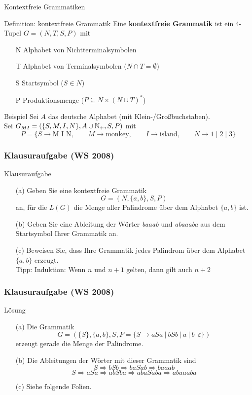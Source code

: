 \begin{frame}{Kontextfreie Grammatiken}
	\begin{block}{Definition: kontextfreie Grammatik}
		Eine \textbf{kontextfreie Grammatik} ist ein 4-Tupel $G = (N, T, S ,P)$ mit
		\begin{itemize}
			\item[N] Alphabet von Nichtterminalsymbolen
			\item[T] Alphabet von Terminalsymbolen ($N \cap T = \emptyset$)
			\item[S] Startsymbol ($S \in N$)
			\item[P] Produktionsmenge ($P \subseteq N \times (N \cup T)^\ast$)
		\end{itemize}
	\end{block}

	\begin{exampleblock}{Beispiel}
		Sei $A$ das deutsche Alphabet (mit Klein-/Großbuchstaben).\\
		Sei $G_{MI} = (\{S, M, I, N\}, A \cup \mathbb{N}_+, S, P)$ mit
		\[
			P = \{S \to \text{M I N}, \qquad M \to \text{monkey}, \qquad I \to \text{island}, \qquad N \to 1 \mid 2 \mid 3 \}
		\]
	\end{exampleblock}
\end{frame}
\begin{frame}
	\frametitle{Klausuraufgabe (WS 2008)}
	\begin{exampleblock}{Klausuraufgabe}
	\begin{itemize}
		\item[(a)] Geben Sie eine kontextfreie Grammatik $$G = (N, \{a, b\}, S, P )$$ an, für die $L(G)$ die Menge aller Palindrome über dem Alphabet $\{a, b\}$ ist.
		\item[(b)] Geben Sie eine Ableitung der Wörter \emph{baaab} und \emph{abaaaba} aus dem Startsymbol Ihrer Grammatik an.
		\item[(c)] Beweisen Sie, dass Ihre Grammatik jedes Palindrom über dem Alphabet $\{a, b\}$ erzeugt.\\
		Tipp: Induktion: Wenn $n$ und $n+1$ gelten, dann gilt auch $n+2$
	\end{itemize}		
	\end{exampleblock}
\end{frame}

\begin{frame}
	\frametitle{Klausuraufgabe (WS 2008)}
	\begin{block}{Lösung}
	\begin{itemize}
		\item[(a)] Die Grammatik $$G = (\{S\}, \{a, b\}, S, P = \{S \to aSa \ | \ bSb \ | \ a \ | \ b \ | \varepsilon \})$$ erzeugt gerade die Menge der Palindrome.
		\item[(b)] Die Ableitungen der Wörter mit dieser Grammatik sind 
				$$S \Rightarrow bSb \Rightarrow baSab \Rightarrow baaab$$
				$$S \Rightarrow aSa \Rightarrow abSba \Rightarrow abaSaba \Rightarrow abaaaba$$
		\item[(c)] Siehe folgende Folien.
	\end{itemize}	
	\end{block}
\end{frame}

